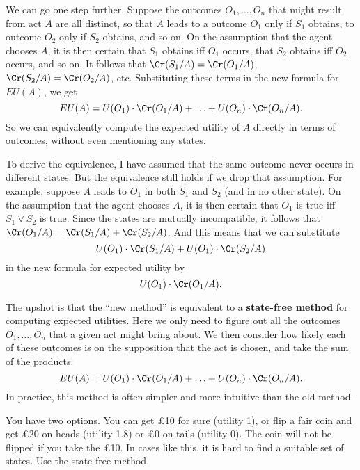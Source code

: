 
We can go one step further. Suppose the outcomes $O_1,\ldots,O_n$ that might
result from act $A$ are all distinct, so that $A$ leads to a outcome $O_1$ only
if $S_1$ obtains, to outcome $O_2$ only if $S_2$ obtains, and so on. On the
assumption that the agent chooses $A$, it is then certain that $S_1$ obtains iff
$O_1$ occurs, that $S_2$ obtains iff $O_2$ occurs, and so on. It follows that
$\Cr(S_1/A) = \Cr(O_1/A)$, $\Cr(S_2/A) = \Cr(O_2/A)$, etc. Substituting these
terms in the new formula for $EU(A)$, we get
\[
EU(A) = U(O_1) \cdot \Cr(O_1/A) + \ldots + U(O_n) \cdot \Cr(O_n/A).
\]
So we can equivalently compute the expected utility of $A$ directly in
terms of outcomes, without even mentioning any states.

To derive the equivalence, I have assumed that the same outcome never
occurs in different states. But the equivalence still holds if we drop
that assumption. For example, suppose $A$ leads to $O_1$ in both $S_1$
and $S_2$ (and in no other state). On the assumption that the agent
chooses $A$, it is then certain that $O_1$ is true iff $S_1\lor S_2$
is true. Since the states are mutually incompatible, it follows that
$\Cr(O_1/A) = \Cr(S_1/A)+\Cr(S_2/A)$. And this means that we can
substitute
\[
  U(O_1)\cdot \Cr(S_1/A) + U(O_1)\cdot \Cr(S_2/A)
\]
in the new formula for expected utility by
\[
  U(O_1)\cdot \Cr(O_1/A).
\]


The upshot is that the ``new method'' is equivalent to a \textbf{state-free method}
for computing expected utilities. Here we only need to figure out all the
outcomes $O_1,\ldots, O_n$ that a given act might bring about. We then consider
how likely each of these outcomes is on the supposition that the act is chosen,
and take the sum of the products:
%
\[
EU(A) = U(O_1) \cdot \Cr(O_1/A) + \ldots + U(O_n) \cdot \Cr(O_n/A).
\]
In practice, this method is often simpler and more intuitive than
the old method.

\begin{exercise}{1}
  You have two options. You can get £10 for sure (utility 1), or flip
  a fair coin and get £20 on heads (utility 1.8) or £0 on tails
  (utility 0). The coin will not be flipped if you take the £10.  In
  cases like this, it is hard to find a suitable set of states. Use
  the state-free method.
\end{exercise}

